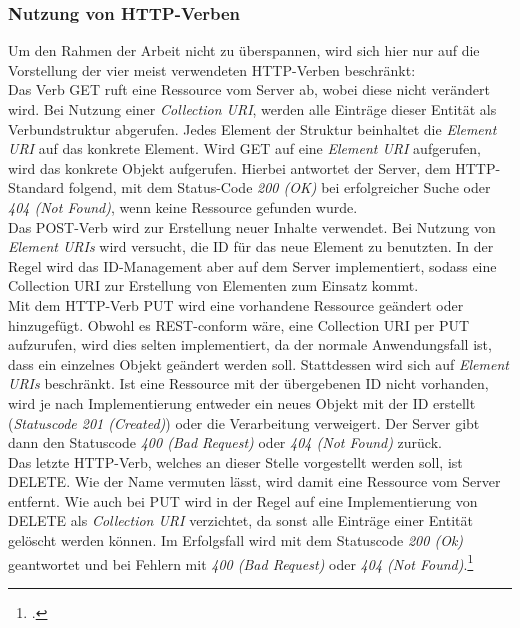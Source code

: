 \subsubsection*{Nutzung von HTTP-Verben}
Um den Rahmen der Arbeit nicht zu überspannen, wird sich hier nur auf die Vorstellung der vier meist verwendeten \ac{HTTP}-Verben beschränkt:\\
Das Verb GET ruft eine Ressource vom Server ab, wobei diese nicht verändert wird. Bei Nutzung einer \textit{Collection \ac{URI}}, werden alle Einträge dieser Entität als Verbundstruktur abgerufen. Jedes Element der Struktur beinhaltet die \textit{Element URI} auf das konkrete Element. Wird GET auf eine \textit{Element URI} aufgerufen, wird das konkrete Objekt aufgerufen. Hierbei antwortet der Server, dem \ac{HTTP}-Standard folgend, mit dem Status-Code \textit{200 (OK)} bei erfolgreicher Suche oder \textit{404 (Not Found)}, wenn keine Ressource gefunden wurde.\\
Das POST-Verb wird zur Erstellung neuer Inhalte verwendet. Bei Nutzung von \textit{Element \ac{URI}s} wird versucht, die ID für das neue Element zu benutzten. In der Regel wird das ID-Management aber auf dem Server implementiert, sodass eine Collection \ac{URI} zur Erstellung von Elementen zum Einsatz kommt.\\
Mit dem HTTP-Verb PUT wird eine vorhandene Ressource geändert oder hinzugefügt. Obwohl es \ac{REST}-conform wäre, eine Collection \ac{URI} per PUT aufzurufen, wird dies selten implementiert, da der normale Anwendungsfall ist, dass ein einzelnes Objekt geändert werden soll. Stattdessen wird sich auf \textit{Element \ac{URI}s} beschränkt. Ist eine Ressource mit der übergebenen ID nicht vorhanden, wird je nach Implementierung entweder ein neues Objekt mit der ID erstellt (\textit{Statuscode 201 (Created)}) oder die Verarbeitung verweigert. Der Server gibt dann den Statuscode \textit{400 (Bad Request)} oder \textit{404 (Not Found)}  zurück. \\
Das letzte \ac{HTTP}-Verb, welches an dieser Stelle vorgestellt werden soll, ist DELETE. Wie der Name vermuten lässt, wird damit eine Ressource vom Server entfernt. Wie auch bei PUT wird in der Regel auf eine Implementierung von DELETE als \textit{Collection \ac{URI}} verzichtet, da sonst alle Einträge einer Entität gelöscht werden können. Im Erfolgsfall wird mit dem Statuscode \textit{200 (Ok)} geantwortet und bei Fehlern mit \textit{400 (Bad Request)} oder \textit{404 (Not Found)}.\footcite[S. 26ff.]{REST-und-HTTP}
